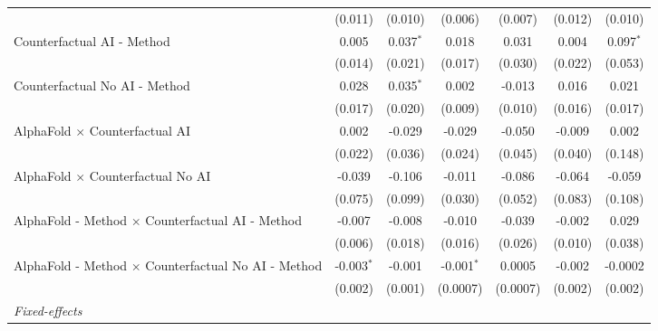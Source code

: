\begin{tabular}{lcccccc}
                                                              & (0.011)       & (0.010)       & (0.006)       & (0.007)       & (0.012)       & (0.010)\\   
   Counterfactual AI - Method                                 & 0.005         & 0.037$^{*}$   & 0.018         & 0.031         & 0.004         & 0.097$^{*}$\\   
                                                              & (0.014)       & (0.021)       & (0.017)       & (0.030)       & (0.022)       & (0.053)\\   
   Counterfactual No AI - Method                              & 0.028         & 0.035$^{*}$   & 0.002         & -0.013        & 0.016         & 0.021\\   
                                                              & (0.017)       & (0.020)       & (0.009)       & (0.010)       & (0.016)       & (0.017)\\   
   AlphaFold $\times$ Counterfactual AI                       & 0.002         & -0.029        & -0.029        & -0.050        & -0.009        & 0.002\\   
                                                              & (0.022)       & (0.036)       & (0.024)       & (0.045)       & (0.040)       & (0.148)\\   
   AlphaFold $\times$ Counterfactual No AI                    & -0.039        & -0.106        & -0.011        & -0.086        & -0.064        & -0.059\\   
                                                              & (0.075)       & (0.099)       & (0.030)       & (0.052)       & (0.083)       & (0.108)\\   
   AlphaFold - Method $\times$ Counterfactual AI - Method     & -0.007        & -0.008        & -0.010        & -0.039        & -0.002        & 0.029\\   
                                                              & (0.006)       & (0.018)       & (0.016)       & (0.026)       & (0.010)       & (0.038)\\   
   AlphaFold - Method $\times$ Counterfactual No AI - Method  & -0.003$^{*}$  & -0.001        & -0.001$^{*}$  & 0.0005        & -0.002        & -0.0002\\   
                                                              & (0.002)       & (0.001)       & (0.0007)      & (0.0007)      & (0.002)       & (0.002)\\   
   \midrule
   \emph{Fixed-effects}\\

\end{tabular}
